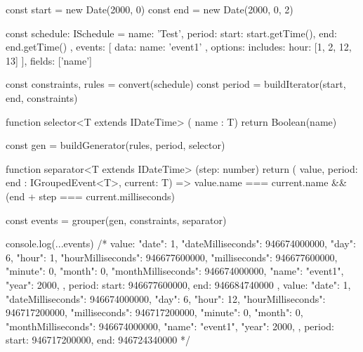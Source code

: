  \hypertarget{app:D}{\label{app:D}}


\begin{code}[frame=single]
const start = new Date(2000, 0)
const end = new Date(2000, 0, 2)

const schedule: ISchedule = {
  name: 'Test',
  period: {
    start: start.getTime(),
    end: end.getTime()
  },
  events: [
    {
      data: { name: 'event1' },
      options: {
        includes: {
          hour: [1, 2, 12, 13]
        }
      }
    }
  ],
  fields: ['name']
}

const { constraints, rules } = convert(schedule)
const period = buildIterator(start, end, constraints)

function selector<T extends IDateTime> ({ name }: T) {
  return Boolean(name)
}

const gen = buildGenerator(rules, period, selector)

function separator<T extends IDateTime> (step: number) {
  return ({ value, period: { end } }: IGroupedEvent<T>,
current: T) =>
    value.name === current.name && (end + step ===
current.milliseconds)
}

const events = grouper(gen, constraints, separator)

console.log(...events)
/*
{
  value: {
    "date": 1,
    "dateMilliseconds": 946674000000, "day": 6,
    "hour": 1, "hourMilliseconds": 946677600000,
    "milliseconds": 946677600000, "minute": 0, "month": 0,
    "monthMilliseconds": 946674000000, "name": "event1",
    "year": 2000,
  },
  period: { start: 946677600000, end: 946684740000 }
},
{
  value: {
    "date": 1,
    "dateMilliseconds": 946674000000, "day": 6,
    "hour": 12, "hourMilliseconds": 946717200000,
    "milliseconds": 946717200000, "minute": 0, "month": 0,
    "monthMilliseconds": 946674000000, "name": "event1",
    "year": 2000,
  },
  period: { start: 946717200000, end: 946724340000 }
}
*/
\end{code}

\clearpage